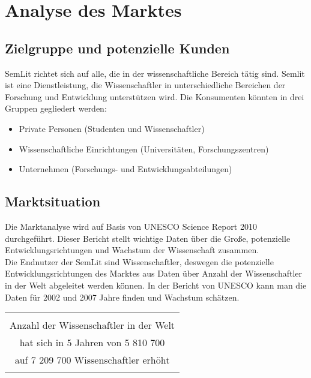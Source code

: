 \section{Analyse des Marktes}


\subsection{Zielgruppe und potenzielle Kunden}
SemLit richtet sich auf alle, die in der wissenschaftliche Bereich tätig sind. Semlit ist eine Dienstleistung, die Wissenschaftler in unterschiedliche Bereichen der Forschung und Entwicklung unterstützen wird. Die Konsumenten könnten in drei Gruppen gegliedert werden:
\begin{itemize}
\item Private Personen (Studenten und Wissenschaftler)

\item Wissenschaftliche Einrichtungen (Universitäten, Forschungszentren)

\item Unternehmen (Forschungs- und Entwicklungsabteilungen)
\end{itemize}

\subsection{Marktsituation}
Die Marktanalyse wird auf Basis von UNESCO Science Report 2010 durchgeführt. Dieser Bericht stellt wichtige Daten über die Große, potenzielle Entwicklungsrichtungen und Wachstum der Wissenschaft zusammen.\\
Die Endnutzer der SemLit sind Wissenschaftler, deswegen  die potenzielle Entwicklungsrichtungen des Marktes aus Daten über Anzahl der Wissenschaftler in der Welt abgeleitet werden können. In der Bericht von UNESCO kann man die Daten für 2002 und 2007 Jahre finden und Wachstum schätzen.\\

\begin{table}[h!]
  \centering
  \begin{large}
  \begin{tabular}{c}\hline
  \\
  {\color{orange}Anzahl der Wissenschaftler in der Welt}\\
  {\color{orange}hat sich in 5 Jahren von 5 810 700}\\
  {\color{orange}auf 7 209 700 Wissenschaftler erhöht}\\ 
  \\\hline
  \end{tabular}
  \end{large}
\end{table}

